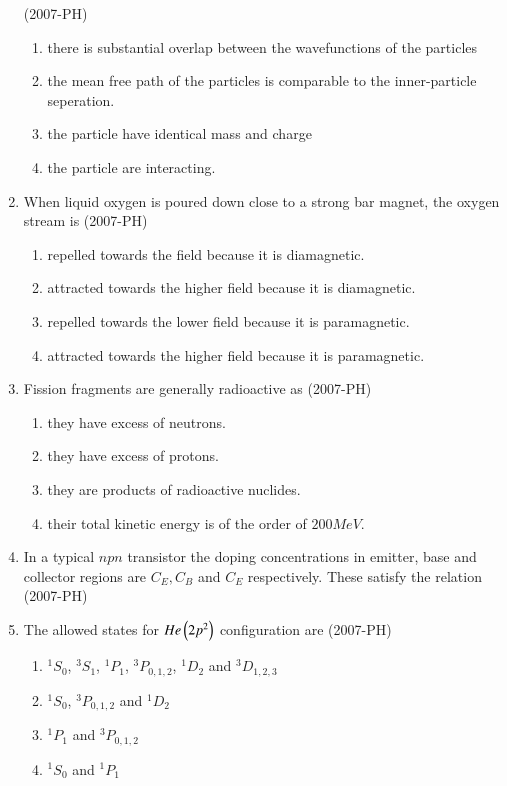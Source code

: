 \documentclass[journal]{IEEEtran}
\begin{document}
\begin{enumerate}
    \hfill(2007-PH)
    \begin{enumerate}
        \item there is substantial overlap between the wavefunctions of the particles
        \item the mean free path of the particles is comparable to the inner-particle seperation.
        \item the particle have identical mass and charge 
        \item the particle are interacting.
\end{enumerate}
\item When liquid oxygen is poured down close to a strong bar magnet, the oxygen stream is  \hfill(2007-PH)
\begin{enumerate}
    \item repelled towards the field because it is diamagnetic.
    \item attracted towards the higher field because it is diamagnetic.
    \item repelled towards the lower field because it is paramagnetic.
    \item attracted towards the higher field because it is paramagnetic.
\end{enumerate}
\item Fission fragments are generally radioactive as \hfill(2007-PH)
\begin{enumerate}
    \item they have excess of neutrons. 
    \item they have excess of protons.
    \item they are products of radioactive nuclides.
    \item their total kinetic energy is of the order of $200MeV$.
\end{enumerate}
\item In a typical $npn$ transistor the doping concentrations in emitter, base and collector regions are $C_E, C_B$ and $C_E$ respectively. These satisfy the relation \hfill(2007-PH)
\begin{enumerate}
\end{enumerate}
\item The allowed states for $He\left(2p^2\right)$ configuration are \hfill(2007-PH)
\begin{enumerate}
        \item $^1S_0$, $^3 S_1$, $^1P_1$, $^3P_{0,1,2}$, $^1D_2$ and $ ^3D_{1,2,3}$
        \item  $^1S_0$, $^3P_{0,1,2}$ and $^1D_2$
        \item $^1P_1$ and $^3P_{0,1,2}$
        \item $^1S_0$ and $^1P_1$
\end{enumerate}
\end{enumerate}
\end{document}
